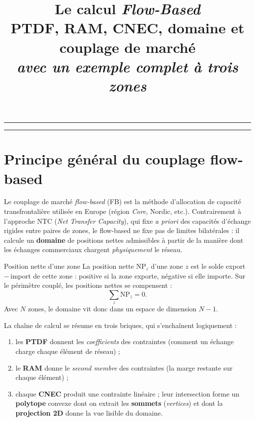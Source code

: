 \documentclass[11pt,a4paper]{article}
\title{\vspace{-1.2cm}\textbf{Le calcul \textit{Flow-Based}}\\[2pt]
\large PTDF, RAM, CNEC, domaine et couplage de marché\\[6pt]
\normalsize\textit{avec un exemple complet à trois zones}}
\author{}
\date{}
\newcommand{\NP}{\mathrm{NP}}
\begin{document}
\maketitle
\vspace{-1.4cm}
\hrule
\vspace{0.4cm}

\tableofcontents
\vspace{0.6cm}
\hrule

\section{Principe général du couplage flow-based}

Le couplage de marché \emph{flow-based} (FB) est la méthode d'allocation
de capacité transfrontalière utilisée en Europe (région \emph{Core},
Nordic, etc.). Contrairement à l'approche NTC (\emph{Net Transfer
Capacity}), qui fixe \emph{a priori} des capacités d'échange rigides entre
paires de zones, le flow-based ne fixe pas de limites bilatérales : il
calcule un \textbf{domaine} de positions nettes admissibles à partir de la
manière dont les échanges commerciaux chargent \emph{physiquement} le
réseau.

\begin{defbox}{Position nette d'une zone}
La position nette $\NP_z$ d'une zone $z$ est le solde
export\,$-$\,import de cette zone : positive si la zone exporte, négative
si elle importe. Sur le périmètre couplé, les positions nettes se
compensent :
\[
  \sum_{z} \NP_z = 0 .
\]
Avec $N$ zones, le domaine vit donc dans un espace de dimension $N-1$.
\end{defbox}

La chaîne de calcul se résume en trois briques, qui s'enchaînent
logiquement :
\begin{enumerate}[nosep]
  \item les \textbf{PTDF} donnent les \emph{coefficients} des contraintes
        (comment un échange charge chaque élément de réseau) ;
  \item le \textbf{RAM} donne le \emph{second membre} des contraintes
        (la marge restante sur chaque élément) ;
  \item chaque \textbf{CNEC} produit une contrainte linéaire ; leur
        intersection forme un \textbf{polytope} convexe dont on extrait
        les \textbf{sommets} (\textit{vertices}) et dont la
        \textbf{projection 2D} donne la vue lisible du domaine.
\end{enumerate}
\end{document}

